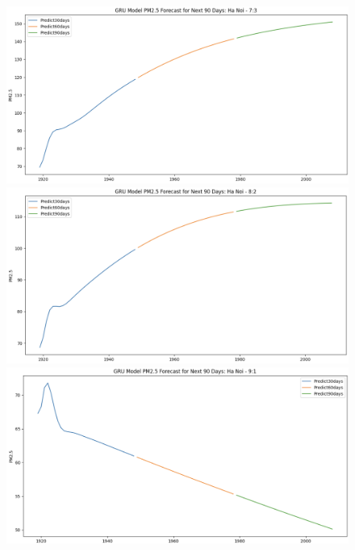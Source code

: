 \begin{figure}[H]
        \begin{minipage}{0.15\textwidth}
            \centering
            \includegraphics[width=1\textwidth]{img/final/GRU/90D/GRU_7_3_HN_90D.png}
            \end{minipage}
            \hfill
            \begin{minipage}{0.15\textwidth}
            \centering
            \includegraphics[width=1\textwidth]{img/final/GRU/90D/GRU_8_2_HN_90D.png}
            \end{minipage}
            \hfill
            \begin{minipage}{0.15\textwidth}
            \centering
            \includegraphics[width=1\textwidth]{img/final/GRU/90D/GRU_9_1_HN_90D.png}
            \end{minipage}
            \hfill
    

\end{figure}
